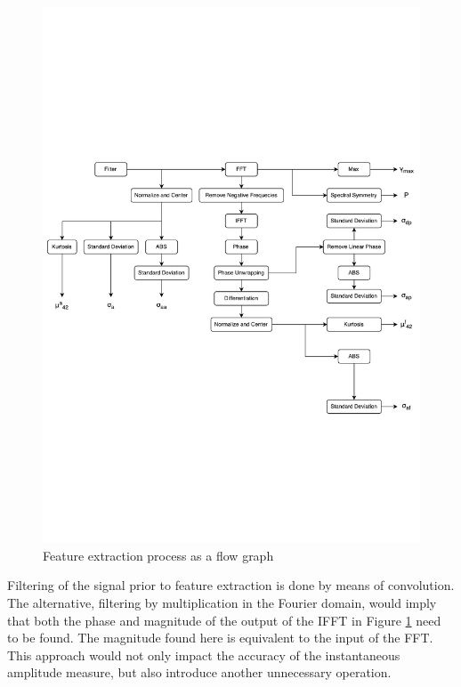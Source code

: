 \documentclass[10pt,twocolumn]{witseiepaper}
\begin{document}
\begin{figure}[!h]
	\centering
	\includegraphics[trim=0cm 10cm 0cm 12cm, clip=true,width=1\textwidth]{large.pdf}
	\caption{Feature extraction process as a flow graph}
	\label{fig:feature}
\end{figure}

Filtering of the signal prior to feature extraction is done by means of convolution. The alternative, filtering by multiplication in the Fourier domain, would imply that both the phase and magnitude of the output of the IFFT in Figure \ref{fig:feature} need to be found. The magnitude found here is equivalent to the input of the FFT. This approach would not only impact the accuracy of the instantaneous amplitude measure, but also introduce another unnecessary operation.
\end{document}
